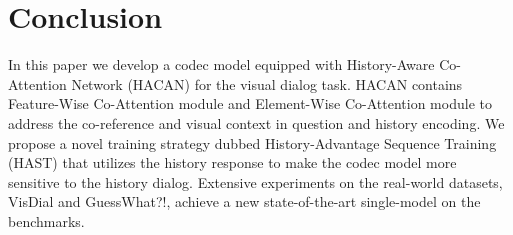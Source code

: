 \documentclass[10pt,twocolumn,letterpaper]{article}
\begin{document}
\section{Conclusion}
In this paper we develop a codec model equipped with History-Aware Co-Attention Network (HACAN) for the visual dialog task. HACAN contains Feature-Wise Co-Attention module and Element-Wise Co-Attention module to address the co-reference and visual context in question and history encoding. We propose a novel training strategy dubbed History-Advantage Sequence Training (HAST) that utilizes the history response to make the codec model more sensitive to the history dialog. Extensive experiments on the real-world datasets, VisDial and GuessWhat?!, achieve a new state-of-the-art single-model on the benchmarks. 


















{\small


}
\end{document}
